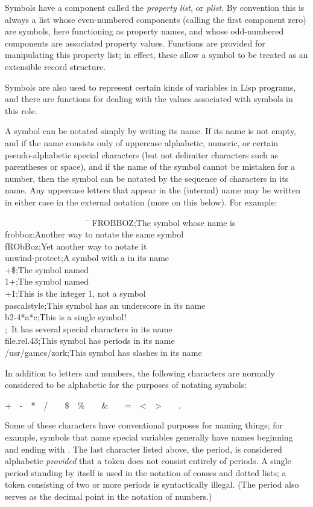 Symbols have a component called the {\it property list}, or {\it plist}.
By convention this is always a list whose even-numbered
components (calling the first component zero) are symbols,
here functioning as property names, and whose odd-numbered components
are associated property values.  Functions are provided for manipulating
this property list; in effect, these allow a symbol to be treated as an
extensible record structure.

Symbols are also used to represent certain kinds of variables in Lisp
programs, and there are functions for dealing with the values associated
with symbols in this role.

A symbol can be notated simply by writing its name.
If its name is not empty, and if the name consists only of
uppercase alphabetic, numeric, or certain pseudo-alphabetic
special characters (but not
delimiter characters such as parentheses or space), and if
the name of the symbol cannot be mistaken for a number, then
the symbol can be notated by the sequence of characters in its name.
Any uppercase letters that appear in the (internal) name may
be written in either case in the external notation (more on this below).
For example:
\begin{lisp}
~~~~~~~~~~~~~~~~~~~~\=\kill
FROBBOZ\>;{\rm The symbol whose name is } \\
frobboz\>;{\rm Another way to notate the same symbol} \\
fRObBoz\>;{\rm Yet another way to notate it} \\
unwind-protect\>;{\rm A symbol with a \cd{-} in its name} \\
+\$\>;{\rm The symbol named \cd{+\$}} \\
1+\>;{\rm The symbol named } \\
+1\>;{\rm This is the integer 1, not a symbol} \\
pascal{\Xunderscore}style\>;{\rm This symbol has an underscore in its name} \\
b{\Xcircumflex}2-4*a*c\>;{\rm This is a single symbol!} \\
\>;~{\rm It has several special characters in its name} \\
file.rel.43\>;{\rm This symbol has periods in its name} \\
/usr/games/zork\>;{\rm This symbol has slashes in its name}
\end{lisp}
In addition to letters and numbers, the following characters are normally
considered to be alphabetic for the purposes of notating
symbols:
\begin{lisp}
+~~-~~*~~/~~{\Xatsign}~~\$~~\%~~{\Xcircumflex}~~\&~~{\Xunderscore}~~=~~<~~>~~{\Xtilde}~~.
\end{lisp}
Some of these characters have conventional purposes for naming things;
for example, symbols that name special variables
generally have names beginning and ending with
\cd{*}.  The last character listed above, the period, is considered alphabetic
{\it provided} that a token does not consist entirely of periods.
A single period standing by itself is used in the notation
of conses and dotted lists; a token consisting of two or more periods
is syntactically illegal.  (The period also serves as the decimal point
in the notation of numbers.)

